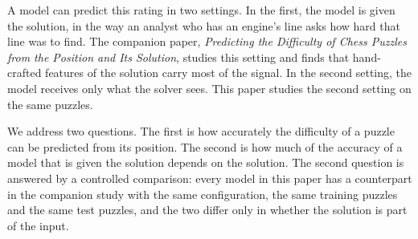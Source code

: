 \documentclass[11pt]{article}
\begin{document}
A model can predict this rating in two settings. In the first, the model is
given the solution, in the way an analyst who has an engine's line asks how
hard that line was to find. The companion paper, \emph{Predicting the
Difficulty of Chess Puzzles from the Position and Its Solution}, studies this
setting and finds that hand-crafted features of the solution carry most of
the signal. In the second setting, the model receives only what the solver
sees. This paper studies the second setting on the same puzzles.

We address two questions. The first is how accurately the difficulty of a
puzzle can be predicted from its position. The second is how much of the
accuracy of a model that is given the solution depends on the solution. The
second question is answered by a controlled comparison: every model in this
paper has a counterpart in the companion study with the same configuration,
the same training puzzles and the same test puzzles, and the two differ only
in whether the solution is part of the input.
\end{document}
